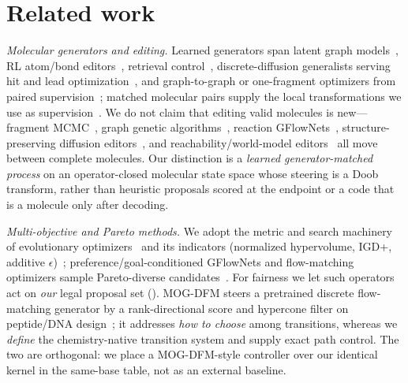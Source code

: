 \section{Related work}
\label{sec:related}

\emph{Molecular generators and editing.} Learned generators span latent graph
models~\citep{jin2018jtvae,jin2020hiervae}, RL atom/bond editors~\citep{zhou2019moldqn}, retrieval
control~\citep{wang2023retmol}, discrete-diffusion generalists serving hit and lead
optimization~\citep{lee2025genmol,gat2024discrete,kaech2025invirtuogen}, and graph-to-graph or
one-fragment optimizers from paired supervision~\citep{jin2019g2g,chen2021modof}; matched molecular pairs
supply the local transformations we use as supervision~\citep{hussain2010mmp,dalke2018mmpdb}. We do not
claim that editing valid molecules is new---fragment MCMC~\citep{xie2021mars}, graph genetic
algorithms~\citep{jensen2019graphga}, reaction GFlowNets~\citep{koziarski2024rgfn}, structure-preserving
diffusion editors~\citep{feng2025moleditrl}, and reachability/world-model
editors~\citep{qiao2026molworld} all move between complete molecules. Our distinction is a \emph{learned
generator-matched process} on an operator-closed molecular state space whose steering is a Doob
transform, rather than heuristic proposals scored at the endpoint or a code that is a molecule only after
decoding.

\emph{Multi-objective and Pareto methods.} We adopt the metric and search machinery of evolutionary
optimizers~\citep{deb2002nsga2,deb2014nsga3,zhang2007moead,beume2007smsemoa,daulton2020qehvi} and its
indicators (normalized hypervolume, IGD+, additive $\epsilon$)~\citep{zitzler1999hypervolume,%
ishibuchi2015igdplus,zitzler2003performance}; preference/goal-conditioned GFlowNets and flow-matching
optimizers sample Pareto-diverse candidates~\citep{jain2023mogfn,bengio2021gflownet,%
bengio2023gflownetfoundations,yuan2025paretoflow,chen2025areuredi}. For fairness we let such operators
act on \emph{our} legal proposal set (). MOG-DFM steers a pretrained discrete
flow-matching generator by a rank-directional score and hypercone filter on peptide/DNA
design~\citep{chen2025mogdfm}; it addresses \emph{how to choose} among transitions, whereas we
\emph{define} the chemistry-native transition system and supply exact path control. The two are
orthogonal: we place a MOG-DFM-style controller over our identical kernel in the same-base table, not as
an external baseline.

